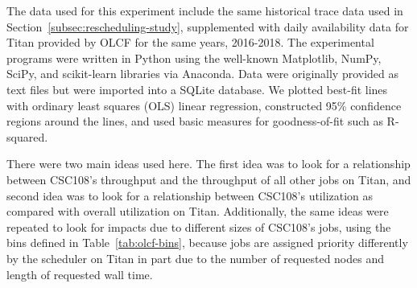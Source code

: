 The data used for this experiment include the same historical trace data used
in Section~\ref{subsec:rescheduling-study}, supplemented with daily availability
data for Titan provided by OLCF for the same years, 2016-2018. The experimental
programs were written in Python using the well-known Matplotlib, NumPy, SciPy,
and scikit-learn libraries via Anaconda. Data were originally provided as text
files but were imported into a SQLite database. We plotted best-fit lines with
ordinary least squares (OLS) linear regression, constructed 95\% confidence
regions around the lines, and used basic measures for goodness-of-fit such as
R-squared.

There were two main ideas used here. The first idea was to look for a
relationship between CSC108's throughput and the throughput of all other jobs
on Titan, and second idea was to look for a relationship between CSC108's
utilization as compared with overall utilization on Titan. Additionally, the
same ideas were repeated to look for impacts due to different sizes of CSC108's
jobs, using the bins defined in Table~\ref{tab:olcf-bins}, because jobs are
assigned priority differently by the scheduler on Titan in part due to the
number of requested nodes and length of requested wall time.

